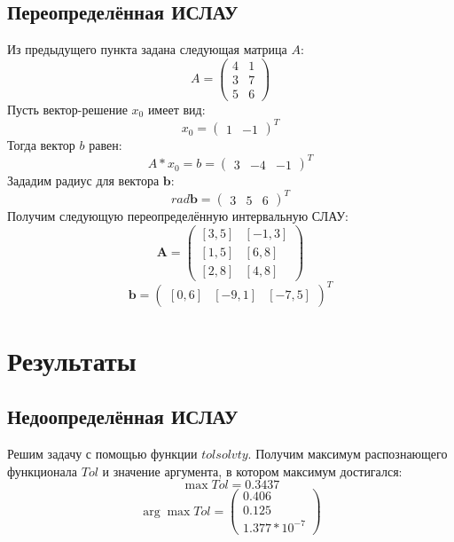 \subsection{Переопределённая ИСЛАУ}
Из предыдущего пункта задана следующая матрица $A$:
\begin{equation}
	A =
	\begin{pmatrix}
		4 & 1 \\
		3 & 7 \\
		5 & 6
	\end{pmatrix}
\end{equation}
Пусть вектор-решение $x_0$ имеет вид:
\begin{equation}
	x_0=
	\begin{pmatrix}
		1 & -1
	\end{pmatrix}^T
\end{equation}
Тогда вектор $b$ равен:
\begin{equation}
	A*x_0=b=
	\begin{pmatrix}
		3 & -4 & -1
	\end{pmatrix}^T
\end{equation}
Зададим радиус для вектора $\textbf{b}$:
\begin{equation}
	rad \textbf{b}=
	\begin{pmatrix}
		3 & 5 & 6
	\end{pmatrix}^T
\end{equation}
Получим следующую переопределённую интервальную СЛАУ:
\begin{equation}
	\textbf{A} =
	\begin{pmatrix}
		[3,5] & [-1,3] \\
		[1,5] & [6,8] \\
		[2,8] & [4,8]
	\end{pmatrix}
\end{equation}
\begin{equation}
	\textbf{b}=
	\begin{pmatrix}
		[0,6] & [-9,1] & [-7, 5]
	\end{pmatrix}^T
\end{equation}



\section{Результаты}

\subsection{Недоопределённая ИСЛАУ}
Решим задачу с помощью функции $tolsolvty$. Получим максимум распознающего функционала $Tol$ и значение аргумента, в котором максимум достигался:
\begin{equation}
	\max Tol = 0.3437
\end{equation}
\begin{equation}
	\arg \max Tol=
	\begin{pmatrix}
		0.406 \\
		0.125 \\
		1.377 * 10^{-7}
	\end{pmatrix}
\end{equation}


